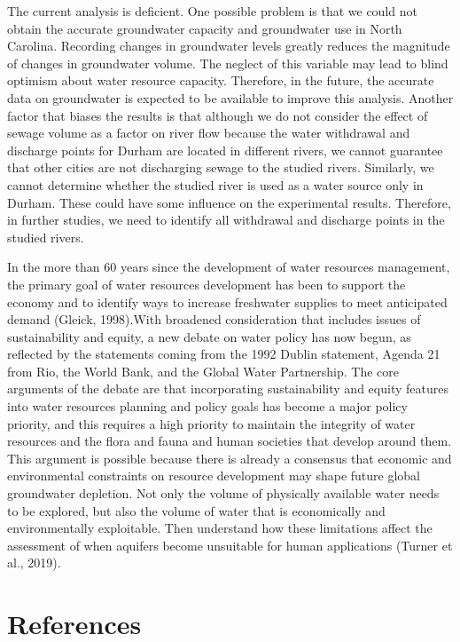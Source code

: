 \documentclass[
  12pt,
]{article}
\begin{document}
The current analysis is deficient. One possible problem is that we could
not obtain the accurate groundwater capacity and groundwater use in
North Carolina. Recording changes in groundwater levels greatly reduces
the magnitude of changes in groundwater volume. The neglect of this
variable may lead to blind optimism about water resource capacity.
Therefore, in the future, the accurate data on groundwater is expected
to be available to improve this analysis. Another factor that biases the
results is that although we do not consider the effect of sewage volume
as a factor on river flow because the water withdrawal and discharge
points for Durham are located in different rivers, we cannot guarantee
that other cities are not discharging sewage to the studied rivers.
Similarly, we cannot determine whether the studied river is used as a
water source only in Durham. These could have some influence on the
experimental results. Therefore, in further studies, we need to identify
all withdrawal and discharge points in the studied rivers.

In the more than 60 years since the development of water resources
management, the primary goal of water resources development has been to
support the economy and to identify ways to increase freshwater supplies
to meet anticipated demand (Gleick, 1998).With broadened consideration
that includes issues of sustainability and equity, a new debate on water
policy has now begun, as reflected by the statements coming from the
1992 Dublin statement, Agenda 21 from Rio, the World Bank, and the
Global Water Partnership. The core arguments of the debate are that
incorporating sustainability and equity features into water resources
planning and policy goals has become a major policy priority, and this
requires a high priority to maintain the integrity of water resources
and the flora and fauna and human societies that develop around them.
This argument is possible because there is already a consensus that
economic and environmental constraints on resource development may shape
future global groundwater depletion. Not only the volume of physically
available water needs to be explored, but also the volume of water that
is economically and environmentally exploitable. Then understand how
these limitations affect the assessment of when aquifers become
unsuitable for human applications (Turner et al., 2019).

\newpage

\hypertarget{references}{%
\section{References}\label{references}}
\end{document}
